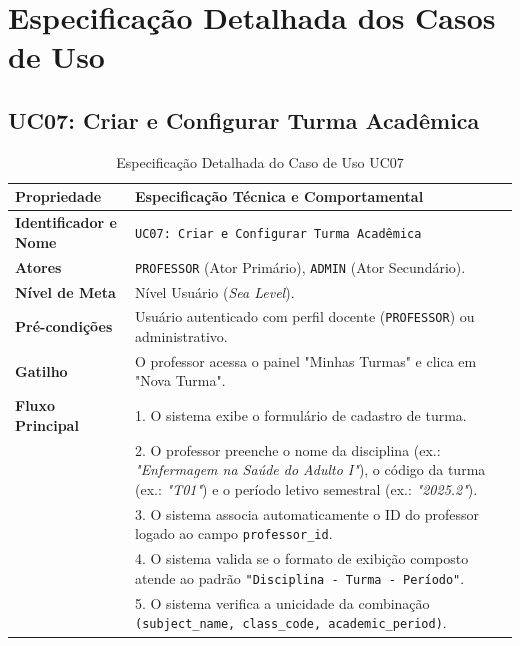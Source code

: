 \section{Especificação Detalhada dos Casos de Uso}
\label{sec_especificacao_uc_turmas}

\subsection{UC07: Criar e Configurar Turma Acadêmica}
\label{uc07_especificacao}

\begin{table}[!ht]
\centering
\caption{Especificação Detalhada do Caso de Uso UC07}
\label{tab_uc07}
\footnotesize
\begin{tabularx}{\textwidth}{p{3.5cm} X}
\toprule
\textbf{Propriedade} & \textbf{Especificação Técnica e Comportamental} \\
\midrule
\textbf{Identificador e Nome} & \texttt{UC07: Criar e Configurar Turma Acadêmica} \\
\textbf{Atores} & \texttt{PROFESSOR} (Ator Primário), \texttt{ADMIN} (Ator Secundário). \\
\textbf{Nível de Meta} & Nível Usuário (\textit{Sea Level}). \\
\textbf{Pré-condições} & Usuário autenticado com perfil docente (\texttt{PROFESSOR}) ou administrativo. \\
\textbf{Gatilho} & O professor acessa o painel "Minhas Turmas" e clica em "Nova Turma". \\
\textbf{Fluxo Principal} & 
1. O sistema exibe o formulário de cadastro de turma.\\
& 2. O professor preenche o nome da disciplina (ex.: \textit{"Enfermagem na Saúde do Adulto I"}), o código da turma (ex.: \textit{"T01"}) e o período letivo semestral (ex.: \textit{"2025.2"}).\\
& 3. O sistema associa automaticamente o ID do professor logado ao campo \texttt{professor\_id}.\\
& 4. O sistema valida se o formato de exibição composto atende ao padrão \texttt{"Disciplina - Turma - Período"}.\\
& 5. O sistema verifica a unicidade da combinação \texttt{(subject\_name, class\_code, academic\_period)}.\\

\end{tabularx}
\end{table}
